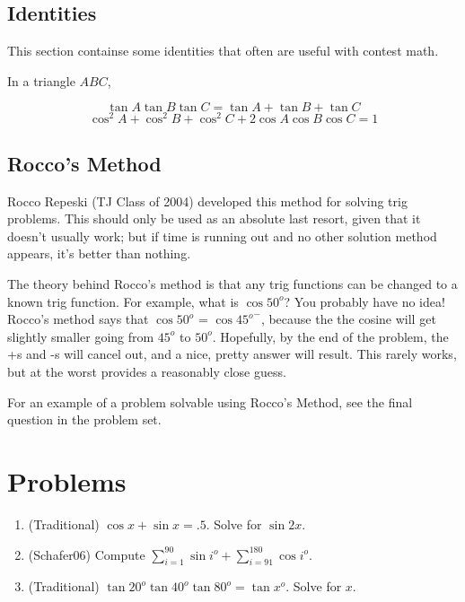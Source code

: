 \documentclass[12pt, letterpaper]{article}
\begin{document}
\subsection{Identities}

\par This section containse some identities that often are useful with contest math.

\par In a triangle $ABC$,

\[
\tan{A}\tan{B}\tan{C} = \tan{A} + \tan{B} + \tan{C}
\]
\[
\cos^2{A}+\cos^2{B}+\cos^2{C}+2\cos{A}\cos{B}\cos{C} = 1
\]

\subsection{Rocco's Method}

\par Rocco Repeski (TJ Class of 2004) developed this method for solving trig problems.  This should only be used as an absolute last resort, given that it doesn't usually work; but if time is running out and no other solution method appears, it's better than nothing.

\par The theory behind Rocco's method is that any trig functions can be changed to a known trig function.  For example, what is $\cos{50^{o}}$?  You probably have no idea!  Rocco's method says that $\cos{50^{o}}$ = $\cos{45^{o}}^-$, because the the cosine will get slightly smaller going from $45^{o}$ to $50^{o}$.  Hopefully, by the end of the problem, the +s and -s will cancel out, and a nice, pretty answer will result.  This rarely works, but at the worst provides a reasonably close guess.

\par For an example of a problem solvable using Rocco's Method, see the final question in the problem set.

\section{Problems}

\begin{enumerate}

\item (Traditional) $\cos{x} + \sin{x} = .5$.  Solve for $\sin{2x}$.

\item (Schafer06) Compute $\displaystyle\sum_{i=1}^{90}{\sin{i^{o}}} + \sum_{i=91}^{180}{\cos{i^{o}}}$.

\item (Traditional) $\tan{20^{o}}\tan{40^{o}}\tan{80^{o}} = \tan{x^{o}}$.  Solve for $x$.

\end{enumerate}
\end{document}
